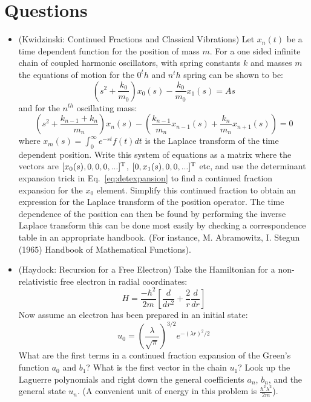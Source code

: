 \section{Questions}
\begin{itemize}
\item (Kwidzinski: Continued Fractions and Classical Vibrations) 
      Let $x_{n}(t)$ be a time dependent function for the position of mass $m$.
      For a one sided infinite chain of coupled harmonic oscillators, with 
      spring constants $k$ and masses $m$ the equations of motion for the $0^th$ and
      $n^th$ spring can be shown to be:
      \begin{equation}
      (s^{2} + \frac{k_{0}}{m_{0}}) x_{0}(s) - \frac{k_{0}}{m_{0}}x_{1}(s) = As 
      \end{equation}
      and for the $n^{th}$ oscillating mass:
      \begin{equation}
      (s^{2}+\frac{k_{n-1}+k_{n}}{m_{n}})x_{n}(s)-(\frac{k_{n-1}}{m_{n}}x_{n-1}(s) + \frac{k_{n}}{m_{n}}x_{n+1}(s)) = 0
      \end{equation}
      where $x_{m}(s) = \int_{0}^{\infty}e^{-st}f(t)dt$ is the Laplace transform of the time dependent position.
      Write this system of equations as a matrix where the vectors are $[x_{0}(s), 0, 0, 0,...]^{\rm T}$, $[0, x_{1}(s), 0, 0, ...]^{\rm T}$ etc,
      and use the determinant expansion trick in Eq.~\ref{eq:detexpansion} to find a continued fraction expansion for the $x_{0}$ element.
      Simplify this continued fraction to obtain an expression for the Laplace transform of the position operator.
      The time dependence of the position can then be found by performing the inverse Laplace transform
      this can be done most easily by checking a correspondence table
      in an appropriate handbook. (For instance, M. Abramowitz, I. Stegun (1965) 
      Handbook of Mathematical Functions).


\item (Haydock: Recursion for a Free Electron) Take the Hamiltonian for a non-relativistic free electron in radial coordinates:
%
\begin{equation}
H = \frac{-\hbar^{2}}{2m}\left[\frac{d}{dr^{2}}+ \frac{2}{r}\frac{d}{dr}\right]
\end{equation}
%
Now assume an electron has been prepared in an initial state:
%
\begin{equation}
u_{0}=(\frac{\lambda}{\sqrt{\pi}})^{3/2} e^{-(\lambda r)^{2}/2}
\end{equation}
%
What are the first terms in a continued fraction expansion of the Green's
function $a_{0}$ and $b_{1}$? What is the first vector in the chain $u_{1}$?
Look up the Laguerre polynomials and right down the general 
coefficients $a_{n}$, $b_n$, and the general state $u_{n}$. 
(A convenient unit of energy in this problem is $\frac{\hbar^{2}\lambda^{2}}{2m}$).


\end{itemize}
